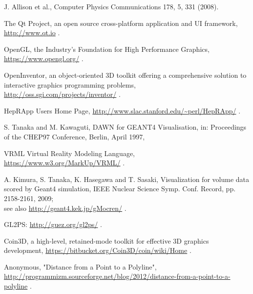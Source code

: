 
J. Allison et al.,
   Computer Physics Communications 178, 5, 331 (2008). 

 The Qt Project, an open source cross-platform application and
                 UI framework, \url{http://www.qt.io} .

 OpenGL, the Industry's Foundation for High Performance 
                  Graphics, \url{https://www.opengl.org/} .

 OpenInventor, an object-oriented 3D toolkit offering a 
                 comprehensive solution to interactive graphics programming 
                 problems, \url{http://oss.sgi.com/projects/inventor/} .

 HepRApp Users Home Page,
                   \url{http://www.slac.stanford.edu/~perl/HepRApp/} .

 S. Tanaka and M. Kawaguti, DAWN for GEANT4 Visualisation, in:
                   Proceedings of the CHEP97 Conference, Berlin, April 1997,

 VRML Virtual Reality Modeling Language,
                   \url{https://www.w3.org/MarkUp/VRML/} .

 A. Kimura, S. Tanaka, K. Hasegawa and T. Sasaki,
                   Visualization for volume data scored by Geant4 simulation,
                   IEEE Nuclear Science Symp. Conf. Record, pp. 2158-2161, 2009; \\
                   see also \url{http://geant4.kek.jp/gMocren/} .



 GL2PS: \url{http://guez.org/gl2ps/} .


 Coin3D, a high-level, retained-mode toolkit for effective
                     3D graphics development, 
                     \url{https://bitbucket.org/Coin3D/coin/wiki/Home} .

 Anonymous, "Distance from a Point to a Polyline",
   \url{http://programmizm.sourceforge.net/blog/2012/distance-from-a-point-to-a-polyline} . 

